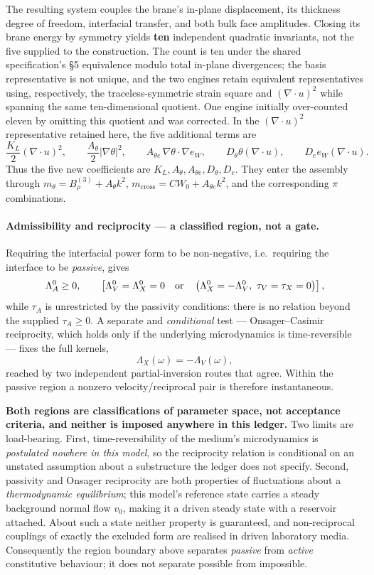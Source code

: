The resulting system couples the brane's in-plane displacement, its thickness
degree of freedom, interfacial transfer, and both bulk face amplitudes. Closing
its brane energy by symmetry yields \textbf{ten} independent quadratic
invariants, not the five supplied to the construction. The count is ten under
the shared specification's \S5 equivalence modulo total in-plane divergences;
the basis representative is not unique, and the two engines retain equivalent
representatives using, respectively, the traceless-symmetric strain square
and \((\nabla\!\cdot u)^2\) while spanning the same ten-dimensional quotient.
One engine initially over-counted eleven by omitting this quotient and was
corrected. In the \((\nabla\!\cdot u)^2\) representative retained here, the
five additional terms are
\[
  \frac{K_L}{2}(\nabla\!\cdot u)^2,
  \qquad
  \frac{A_\theta}{2}|\nabla\theta|^2,
  \qquad
  A_{\theta e}\,\nabla\theta\!\cdot\!\nabla e_W,
  \qquad
  D_\theta\theta(\nabla\!\cdot u),
  \qquad
  D_e e_W(\nabla\!\cdot u).
\]
Thus the five new coefficients are
\(K_L,A_\theta,A_{\theta e},D_\theta,D_e\). They enter the assembly through
\(m_\theta=B_\rho^{(3)}+A_\theta k^2\),
\(m_{\mathrm{cross}}=CW_0+A_{\theta e}k^2\), and the corresponding \(\pi\)
combinations.

\paragraph{Admissibility and reciprocity --- a classified region, not a gate.}
Requiring the interfacial power form to be non-negative, i.e.\ requiring the
interface to be \emph{passive}, gives
\[
  \Lambda_A^0\geq0,
  \qquad
  \left[
  \Lambda_V^0=\Lambda_X^0=0
  \quad\hbox{or}\quad
  \left(\Lambda_X^0=-\Lambda_V^0,\ \tau_V=\tau_X=0\right)
  \right],
\]
while \(\tau_A\) is unrestricted by the passivity conditions: there is no
relation beyond the supplied \(\tau_A\geq0\). A separate and
\emph{conditional} test --- Onsager--Casimir reciprocity, which holds only if
the underlying microdynamics is time-reversible --- fixes the full kernels,
\[
  \Lambda_X(\omega)=-\Lambda_V(\omega),
\]
reached by two independent partial-inversion routes that agree. Within the
passive region a nonzero velocity/reciprocal pair is therefore instantaneous.

\textbf{Both regions are classifications of parameter space, not acceptance
criteria, and neither is imposed anywhere in this ledger.} Two limits are
load-bearing. First, time-reversibility of the medium's microdynamics is
\emph{postulated nowhere in this model}, so the reciprocity relation is
conditional on an unstated assumption about a substructure the ledger does not
specify. Second, passivity and Onsager reciprocity are both properties of
fluctuations about a \emph{thermodynamic equilibrium}; this model's reference
state carries a steady background normal flow \(v_0\), making it a driven
steady state with a reservoir attached. About such a state neither property is
guaranteed, and non-reciprocal couplings of exactly the excluded form are
realised in driven laboratory media. Consequently the region boundary above
separates \emph{passive} from \emph{active} constitutive behaviour; it does not
separate possible from impossible.

